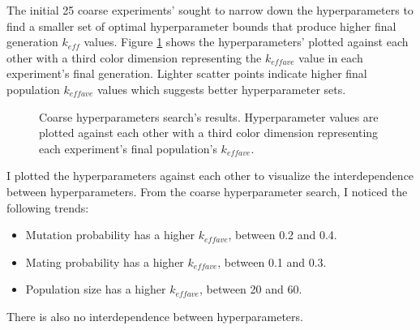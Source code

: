 The initial 25 coarse experiments' sought to narrow down the hyperparameters 
to find a smaller set of optimal hyperparameter bounds that produce higher final 
generation $k_{eff}$ values.
Figure \ref{fig:hyperparameter_sens} shows the hyperparameters' plotted against 
each other with a third color dimension representing the $k_{eff ave}$ 
value in each experiment's final generation. 
Lighter scatter points indicate higher final population $k_{eff ave}$ values 
which suggests better hyperparameter sets. 
\begin{figure}[]
    \centering
    \caption{Coarse hyperparameters search's results. Hyperparameter values are plotted 
    against each other with a third color dimension representing each experiment's 
    final population's $k_{eff ave}$.}
    \label{fig:hyperparameter_sens}
\end{figure}
I plotted the hyperparameters against each other to visualize the interdependence 
between hyperparameters. 
From the coarse hyperparameter search, I noticed the following trends: 
\begin{itemize}
    \item Mutation probability has a higher $k_{eff ave}$, between 0.2 and 0.4. 
    \item Mating probability has a higher $k_{eff ave}$, between 0.1 and 0.3. 
    \item Population size has a higher $k_{eff ave}$, between 20 and 60. 
\end{itemize}
There is also no interdependence between hyperparameters. 

